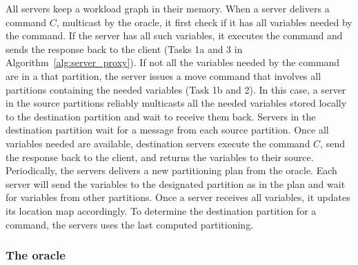 All servers keep a workload graph in their memory. When a server delivers a command $C$, multicast by the oracle, it first check if it has all variables needed by the command. If the server has all such variables, it executes the command and sends the response back to the client (Tasks 1a and 3 in Algorithm~\ref{alg:server_proxy}).
If not all the variables needed by the command are in a that partition, the server issues a move command that involves all partitions containing the needed variables (Task 1b and 2).
In this case, a server in the source partitions reliably multicasts all the needed variables stored locally to the destination partition and wait to receive them back.
Servers in the destination partition wait for a message from each source partition. Once all variables needed are available, destination servers execute the command $C$, send the response back to the client, and returns the variables to their source.
Periodically, the servers delivers a new partitioning plan from the oracle. Each server will send the variables to the designated partition as in the plan and wait for variables from other partitions. Once a server receives all variables, it updates its location map accordingly.
To determine the destination partition for a command, the servers uses the last computed partitioning.

\subsubsection{The oracle} 

